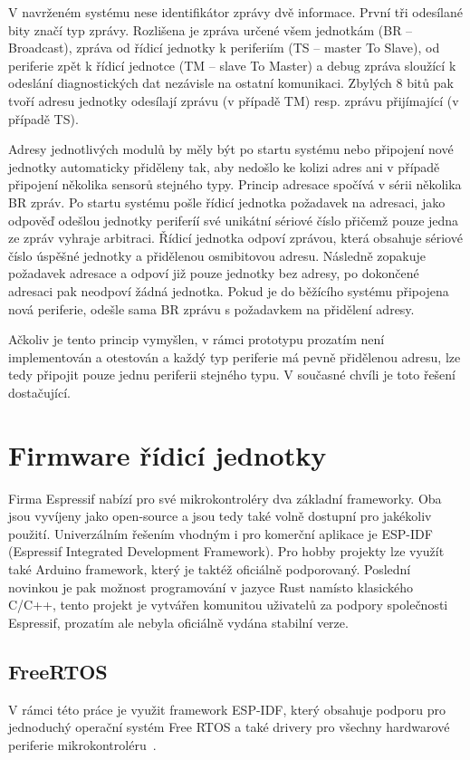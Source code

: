     V navrženém systému nese identifikátor zprávy dvě informace. První tři odesílané bity značí typ zprávy. Rozlišena je zpráva určené všem jednotkám (BR -- Broadcast), zpráva od řídicí jednotky k periferiím (TS -- master To Slave), od periferie zpět k řídicí jednotce (TM -- slave To Master) a debug zpráva sloužící k odeslání diagnostických dat nezávisle na ostatní komunikaci. Zbylých 8 bitů pak tvoří adresu jednotky odesílají zprávu (v případě TM) resp. zprávu přijímající (v případě TS). 
    
    Adresy jednotlivých modulů by měly být po startu systému nebo připojení nové jednotky automaticky přiděleny tak, aby nedošlo ke kolizi adres ani v případě připojení několika sensorů stejného typy. Princip adresace spočívá v sérii několika BR zpráv. Po startu systému pošle řídicí jednotka požadavek na adresaci, jako odpověď odešlou jednotky periferíí své unikátní sériové číslo přičemž pouze jedna ze zpráv vyhraje arbitraci. Řídicí jednotka odpoví zprávou, která obsahuje sériové číslo úspěšné jednotky a přidělenou osmibitovou adresu. Následně zopakuje požadavek adresace a odpoví již pouze jednotky bez adresy, po dokončené adresaci pak neodpoví žádná jednotka. Pokud je do běžícího systému připojena nová periferie, odešle sama BR zprávu s požadavkem na přidělení adresy.

    Ačkoliv je tento princip vymyšlen, v rámci prototypu prozatím není implementován a otestován a každý typ periferie má pevně přidělenou adresu, lze tedy připojit pouze jednu periferii stejného typu. V současné chvíli je toto řešení dostačující.



\section{Firmware řídicí jednotky}
    Firma Espressif nabízí pro své mikrokontroléry dva základní frameworky. Oba jsou vyvíjeny jako open-source a jsou tedy také volně dostupní pro jakékoliv použití. Univerzálním řešením vhodným i pro komerční aplikace je ESP-IDF (Espressif Integrated Development Framework). Pro hobby projekty lze využít také Arduino framework, který je taktéž oficiálně podporovaný. Poslední novinkou je pak možnost programování v jazyce Rust namísto klasického C/C++, tento projekt je vytvářen komunitou uživatelů za podpory společnosti Espressif, prozatím ale nebyla oficiálně vydána stabilní verze. 

    \subsection{FreeRTOS}
        V rámci této práce je využit framework ESP-IDF, který obsahuje podporu pro jednoduchý operační systém Free RTOS a také drivery pro všechny hardwarové periferie mikrokontroléru~\cite{espressif-idf}.

